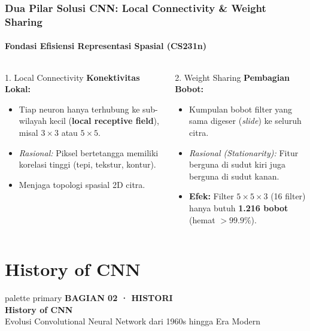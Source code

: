 \documentclass[t,aspectratio=169,xcolor=dvipsnames]{beamer}
\begin{document}
\begin{frame}
    \frametitle{Dua Pilar Solusi CNN: Local Connectivity \& Weight Sharing}
    \framesubtitle{Fondasi Efisiensi Representasi Spasial (CS231n)}
    \footnotesize

    \begin{columns}[t]
        \begin{block}{1. Local Connectivity}
            \textbf{Konektivitas Lokal:}
            \begin{itemize}
                \item Tiap neuron hanya terhubung ke sub-wilayah kecil (\textbf{local receptive field}), misal $3\times3$ atau $5\times5$.
                \item \textit{Rasional:} Piksel bertetangga memiliki korelasi tinggi (tepi, tekstur, kontur).
                \item Menjaga topologi spasial 2D citra.
            \end{itemize}
        \end{block}

        \begin{exampleblock}{2. Weight Sharing}
            \textbf{Pembagian Bobot:}
            \begin{itemize}
                \item Kumpulan bobot filter yang sama digeser (\textit{slide}) ke seluruh citra.
                \item \textit{Rasional (Stationarity):} Fitur berguna di sudut kiri juga berguna di sudut kanan.
                \item \textbf{Efek:} Filter $5\times5\times3$ (16 filter) hanya butuh \textbf{1.216 bobot} (hemat $>99.9\%$).
            \end{itemize}
        \end{exampleblock}
    \end{columns}

\end{frame}

\section{History of CNN}

\begin{frame}[plain]
  \begin{beamercolorbox}[wd=\paperwidth,ht=\paperheight,sep=1.5cm]{palette primary}
    \vspace{1.5cm}
    {\scriptsize\bfseries\color{dlMute}BAGIAN 02 · HISTORI}\\[0.4cm]
    {\Huge\bfseries History of CNN}\\[0.4cm]
    {\small\color{dlHairline}Evolusi Convolutional Neural Network dari 1960s hingga Era Modern}
    \vfill
  \end{beamercolorbox}
\end{frame}
\end{document}
